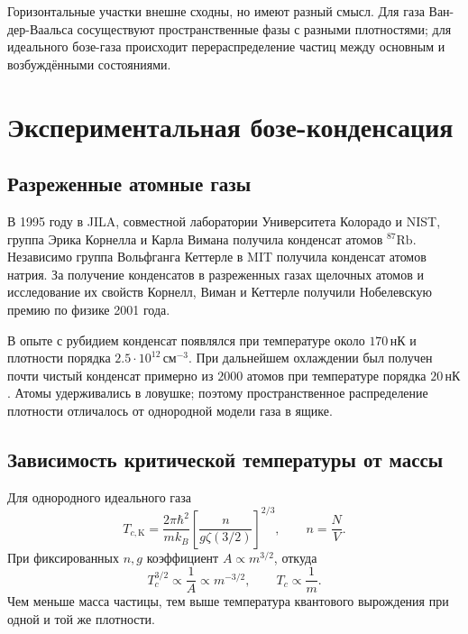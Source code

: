 \documentclass[../final.tex]{subfiles}
\begin{document}
Горизонтальные участки внешне сходны, но имеют разный смысл.
Для газа Ван-дер-Ваальса сосуществуют пространственные фазы с разными плотностями;
для идеального бозе-газа происходит перераспределение частиц между основным
и возбуждёнными состояниями.

\clearpage
\section{Экспериментальная бозе-конденсация}
\subsection{Разреженные атомные газы}
В 1995 году в JILA, совместной лаборатории Университета Колорадо и NIST,
группа Эрика Корнелла и Карла Вимана получила конденсат атомов $^{87}\mathrm{Rb}$.
Независимо группа Вольфганга Кеттерле в MIT получила конденсат атомов натрия.
За получение конденсатов в разреженных газах щелочных атомов и исследование
их свойств Корнелл, Виман и Кеттерле получили Нобелевскую премию по физике 2001 года.

В опыте с рубидием конденсат появлялся при температуре около
$170\,\text{нК}$ и плотности порядка $2.5\cdot10^{12}\,\text{см}^{-3}$.
При дальнейшем охлаждении был получен почти чистый конденсат примерно
из $2000$ атомов при температуре порядка $20\,\text{нК}$.
Атомы удерживались в ловушке; поэтому пространственное распределение плотности
отличалось от однородной модели газа в ящике.

\subsection{Зависимость критической температуры от массы}
Для однородного идеального газа
\begin{equation*}
 T_{c,\mathrm K}=\frac{2\pi\hbar^2}{mk_B}
 \left[\frac{n}{g\zeta(3/2)}\right]^{2/3},\qquad n=\frac NV.
\end{equation*}
При фиксированных $n,g$ коэффициент $A\propto m^{3/2}$, откуда
\begin{equation*}
 T_c^{3/2}\propto\frac1A\propto m^{-3/2},\qquad T_c\propto\frac1m.
\end{equation*}
Чем меньше масса частицы, тем выше температура квантового вырождения
при одной и той же плотности.
\end{document}
